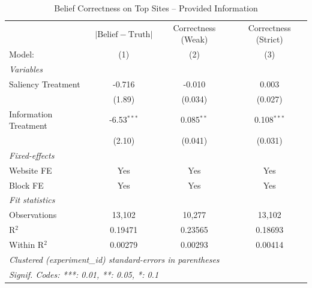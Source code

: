 
\begin{table}[htbp]
   \caption{Belief Correctness on Top Sites -- Provided Information}
   \centering
   \begin{tabular}{lccc}
      \tabularnewline \midrule \midrule
                            & $\lvert \text{Belief} - \text{Truth} \rvert$     & Correctness (Weak) & Correctness (Strict) \\   
      Model:                & (1)                                              & (2)                & (3)\\  
      \midrule
      \emph{Variables}\\
      Saliency Treatment    & -0.716                                           & -0.010             & 0.003\\   
                            & (1.89)                                           & (0.034)            & (0.027)\\   
      Information Treatment & -6.53$^{***}$                                    & 0.085$^{**}$       & 0.108$^{***}$\\   
                            & (2.10)                                           & (0.041)            & (0.031)\\   
      \midrule
      \emph{Fixed-effects}\\
      Website FE            & Yes                                              & Yes                & Yes\\  
      Block FE              & Yes                                              & Yes                & Yes\\  
      \midrule
      \emph{Fit statistics}\\
      Observations          & 13,102                                           & 10,277             & 13,102\\  
      R$^2$                 & 0.19471                                          & 0.23565            & 0.18693\\  
      Within R$^2$          & 0.00279                                          & 0.00293            & 0.00414\\  
      \midrule \midrule
      \multicolumn{4}{l}{\emph{Clustered (experiment\_id) standard-errors in parentheses}}\\
      \multicolumn{4}{l}{\emph{Signif. Codes: ***: 0.01, **: 0.05, *: 0.1}}\\
   \end{tabular}
\end{table}



